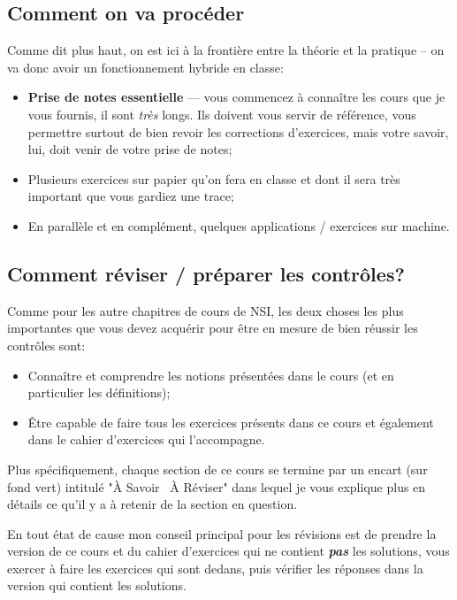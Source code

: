 \documentclass[12pt]{article}
\begin{document}
	\subsection{Comment on va procéder}
	Comme dit plus haut, on est ici à la frontière entre la théorie et la pratique -- on va donc avoir un fonctionnement hybride en classe:
	 \begin{itemize}
	 	\item \textbf{Prise de notes essentielle} --- vous commencez à connaître les cours que je vous fournis, il sont \textit{très} longs. Ils doivent vous servir de référence, vous permettre surtout de bien revoir les corrections d'exercices, mais votre savoir, lui, doit venir de votre prise de notes;
	 	\item Plusieurs exercices sur papier qu'on fera en classe et dont il sera très important que vous gardiez une trace;
	 	\item En parallèle et en complément, quelques applications / exercices sur machine.
	 \end{itemize}
	
	\subsection{Comment réviser / préparer les contrôles?}
	
	Comme pour les autre chapitres de cours de NSI, les deux choses les plus importantes que vous devez acquérir pour être en mesure de bien réussir les contrôles sont:
	\begin{itemize}
		\item Connaître et comprendre les notions présentées dans le cours (et en particulier les définitions);
		\item Être capable de faire tous les exercices présents dans ce cours et également dans le cahier d'exercices qui l'accompagne.
	\end{itemize}
	 
	 Plus spécifiquement, chaque section de ce cours se termine par un encart (sur fond vert) intitulé "À Savoir \faExchange \ À Réviser" dans lequel je vous explique plus en détails ce qu'il y a à retenir de la section en question.
	 
	 En tout état de cause mon conseil principal pour les révisions est de prendre la version de ce cours et du cahier d'exercices qui ne contient \textit{\textbf{pas}} les solutions, vous exercer à faire les exercices qui sont dedans, puis vérifier les réponses dans la version qui contient les solutions.
	 
\end{document}
